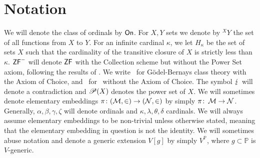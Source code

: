\documentclass[../main]{subfiles}
\begin{document}
\chapter{Notation}
\thispagestyle{fancy}

\setlength{\parindent}{18pt}
\begin{onehalfspacing}

  We will denote the class of ordinals by $\textsf{On}$. For $X,Y$ sets we denote by ${^X}Y$ the set of all functions from $X$ to $Y$. For an infinite cardinal $\kappa$, we let $H_\kappa$ be the set of sets $X$ such that the cardinality of the transitive closure of $X$ is strictly less than $\kappa$. $\textsf{ZF}^-$ will denote $\textsf{ZF}$ with the Collection scheme but without the Power Set axiom, following the results of \cite{ZFwithoutPowerSet}. We write \gbc\ for G\"odel-Bernays class theory with the Axiom of Choice, and \gb\ for \gbc\ without the Axiom of Choice. The symbol $\operatorname{\lightning}$ will denote a contradiction and $\mathscr P(X)$ denotes the power set of $X$. We will sometimes denote elementary embeddings $\pi\colon(\operatorname{\mathcal M},\in)\to(\operatorname{\mathcal N},\in)$ by simply $\pi\colon\operatorname{\mathcal M}\to\operatorname{\mathcal N}$. Generally, $\alpha,\beta,\gamma,\zeta$ will denote ordinals and $\kappa,\lambda,\theta,\delta$ cardinals. We will always assume elementary embeddings to be non-trivial unless otherwise stated, meaning that the elementary embedding in question is not the identity. We will sometimes abuse notation and denote a generic extension $V[g]$ by simply $V^{\mathbb P}$, where $g\subset\mathbb P$ is $V$-generic.


\end{onehalfspacing}
\setlength{\parindent}{0pt}
\end{document}
